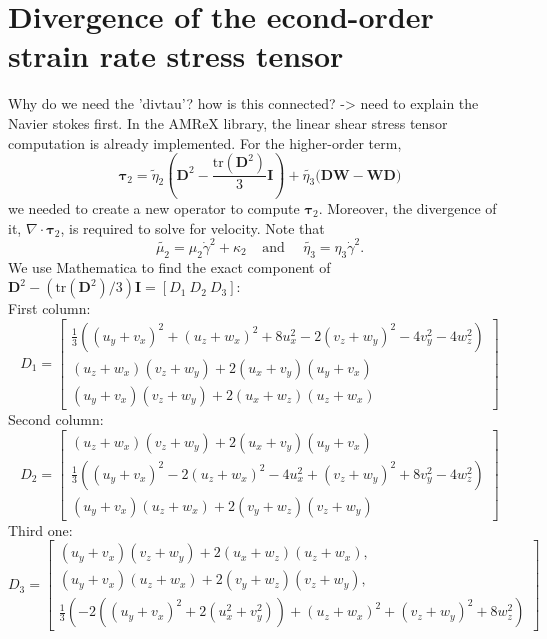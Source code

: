 \section{Divergence of the econd-order strain rate stress tensor}
Why do we need the 'divtau'? how is this connected? 
-> need to explain the Navier stokes first. 
In the AMReX library, the linear shear stress tensor computation is already implemented. For the higher-order term,
\[
  {\bm \tau}_{2} = 
  \tilde{\eta}_2
  \left( {\bm D}^2  - \frac{\text{tr}\left({\bm D}^2\right)}{3}{\bm I} \right)
  + \tilde{\eta_3} 
  \biggl( {\bm{DW}} - {\bm{WD}} \biggr)  
\]
we needed to create a new operator to compute $ {\bm \tau}_{2}$. Moreover, the divergence of it, $\nabla \cdot {\bm \tau}_{2}$, is required to solve for velocity. Note that 
\[
\tilde{\mu_2} =  \mu_2  \dot{\gamma}^2
+  \kappa_2 
\ \ \ \ \ \text{and} \ \ \ \ \ \
\tilde{\eta_3} =    \eta_3 \dot{\gamma}^2 .
\]
We use Mathematica to find the exact component of  ${\bm D}^2 - (\text{tr}({\bm D}^2)/3) {\bm I} = \left[ D_1  \ D_2 \ D_3 \right]$:
\\
First column:
\[
D_1 =
\begin{bmatrix}
   \frac{1}{3} \left(\left(u_y+v_x\right)^2+\left(u_z+w_x\right)^2+8 u_x^2-2 \left(v_z+w_y\right)^2-4 v_y^2-4 w_z^2\right)
   \\
   \left(u_z+w_x\right) \left(v_z+w_y\right)+2 \left(u_x+v_y\right) \left(u_y+v_x\right)
   \\
   \left(u_y+v_x\right) \left(v_z+w_y\right)+2 \left(u_x+w_z\right) \left(u_z+w_x\right)
\end{bmatrix}
\]
Second column:
\[
D_2 = 
\begin{bmatrix}
   \left(u_z+w_x\right) \left(v_z+w_y\right)+2 \left(u_x+v_y\right) \left(u_y+v_x\right)
   \\
   \frac{1}{3} \left(\left(u_y+v_x\right)^2-2 \left(u_z+w_x\right)^2-4 u_x^2+\left(v_z+w_y\right)^2+8 v_y^2-4 w_z^2\right)
   \\
   \left(u_y+v_x\right) \left(u_z+w_x\right)+2 \left(v_y+w_z\right) \left(v_z+w_y\right)
\end{bmatrix}
\]
Third one:
\[
D_3 = 
\begin{bmatrix}
   \left(u_y+v_x\right) \left(v_z+w_y\right)+2 \left(u_x+w_z\right) \left(u_z+w_x\right),
    \\
   \left(u_y+v_x\right) \left(u_z+w_x\right)+2 \left(v_y+w_z\right) \left(v_z+w_y\right),
   \\
   \frac{1}{3} \left(-2 \left(\left(u_y+v_x\right)^2+2 \left(u_x^2+v_y^2\right)\right)+\left(u_z+w_x\right)^2+\left(v_z+w_y\right)^2+8 w_z^2\right)
\end{bmatrix}
\]
